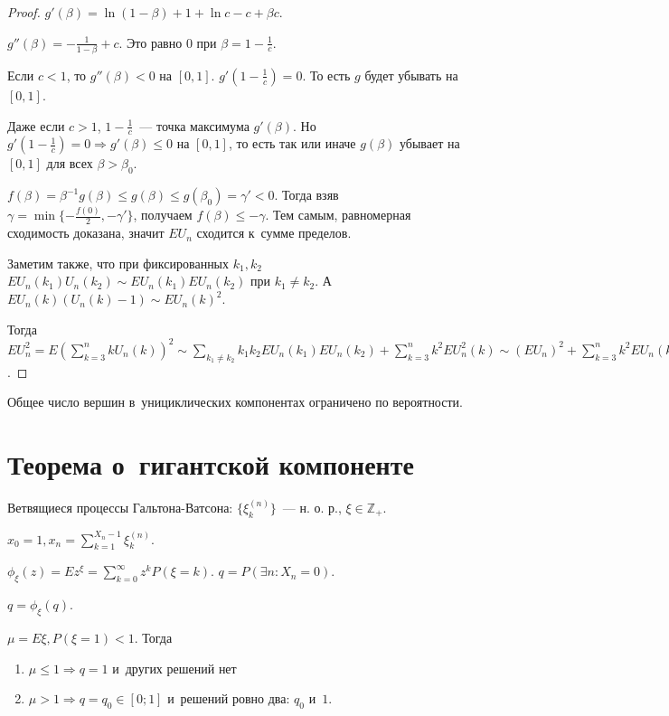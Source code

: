 \documentclass{article}
\begin{document}
\begin{proof}
	$g'(\beta) = \ln(1 - \beta) + 1 + \ln c - c + \beta c$.

	$g''(\beta) = -\frac{1}{1 - \beta} + c$. Это равно 0 при $\beta = 1 - \frac{1}{c}$.

	Если $c < 1$, то $g''(\beta) < 0$ на $[0, 1]$. $g'(1 - \frac{1}{c}) = 0$. То есть $g$ будет
	убывать на $[0, 1]$.

	Даже если $c > 1$, $1 - \frac{1}{c}$~--- точка максимума $g'(\beta)$. Но $g'(1 - \frac{1}{c}) = 0
	\Rightarrow g'(\beta) \le 0$ на $[0, 1]$, то есть так или иначе $g(\beta)$ убывает на $[0, 1]$ для
	всех $\beta > \beta_0$.

	$f(\beta) = \beta^{-1}g(\beta) \le g(\beta) \le g(\beta_0) = \gamma' < 0$. Тогда взяв $\gamma =
	\min\{-\frac{f(0)}{2}, -\gamma'\}$, получаем $f(\beta) \le -\gamma$. Тем самым, равномерная
	сходимость доказана, значит $EU_n$ сходится к~сумме пределов.

	Заметим также, что при фиксированных $k_1, k_2$ $E U_n(k_1) U_n(k_2) \sim EU_n(k_1) EU_n(k_2)$ при
	$k_1 \ne k_2$. А~$EU_n(k)(U_n(k)-1) \sim EU_n(k)^2$.

	Тогда $EU_n^2 = E\left(\sum\limits_{k=3}^n kU_n(k)\right)^2 \sim \sum\limits_{k_1 \ne k_2} k_1 k_2
	EU_n(k_1) EU_n(k_2) + \sum\limits_{k=3}^n k^2 EU_n^2(k) \sim (EU_n)^2 + \sum\limits_{k=3}^n k^2
	EU_n(k) \Rightarrow DU_n \rightarrow \frac{1}{2} \sum\limits_{k=3}^\infty k(ce^{-c})^k
	\sum\limits_{j=0}^{k-3} \frac{k^j}{j!}$.
\end{proof}

\begin{corollary}
	Общее число вершин в~унициклических компонентах ограничено по вероятности.
\end{corollary}

\section{Теорема о~гигантской компоненте}

Ветвящиеся процессы Гальтона-Ватсона: $\{ \xi_k^{(n)} \}$~--- н. о. р., $\xi \in \mathbb{Z}_+$.

$x_0 = 1, x_n = \sum_{k=1}^{X_n-1} \xi_k^{(n)}$.

$\phi_\xi(z) = Ez^\xi = \sum\limits_{k=0}^\infty z^k P(\xi = k)$. $q = P(\exists n: X_n = 0)$.

\begin{claim}
	$q = \phi_\xi(q)$.
\end{claim}

\begin{theorem}
	$\mu = E\xi, P(\xi = 1) < 1$. Тогда
	\begin{enumerate}
		\item $\mu \le 1 \Rightarrow q = 1$ и~других решений нет
		\item $\mu > 1 \Rightarrow q = q_0 \in [0; 1]$ и~решений ровно два: $q_0$ и~$1$.
	\end{enumerate}
\end{theorem}
\end{document}
